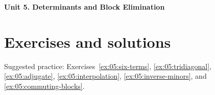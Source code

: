 \documentclass[12pt]{article}
\begin{document}
{\Large\bfseries Unit 5. Determinants and Block Elimination}\par

\clearpage
\section*{Exercises and solutions}
Suggested practice: Exercises~\ref{ex:05:six-terms},
\ref{ex:05:tridiagonal}, \ref{ex:05:adjugate},
\ref{ex:05:interpolation}, \ref{ex:05:inverse-minors}, and
\ref{ex:05:commuting-blocks}.

\end{document}
